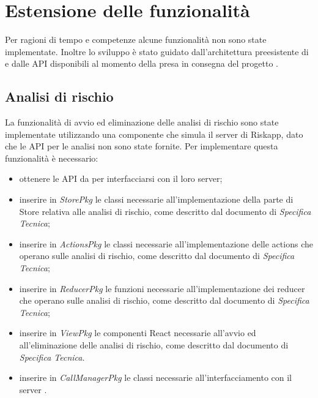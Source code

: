 \newpage

\section{Estensione delle funzionalità}
Per ragioni di tempo e competenze alcune funzionalità non sono state implementate. Inoltre lo sviluppo è stato guidato dall'architettura preesistente di \riskapp{} e dalle API disponibili al momento della presa in consegna del progetto \progetto.

\subsection{Analisi di rischio}
La funzionalità di avvio ed eliminazione delle analisi di rischio sono state implementate utilizzando una componente che simula il server di Riskapp, dato che le API per le analisi non sono state fornite. Per implementare questa funzionalità è necessario: 
\begin{itemize}
	\item ottenere le API da \riskapp{} per interfacciarsi con il loro server;
	\item inserire in \textit{StorePkg} le classi necessarie all'implementazione della parte di Store relativa alle analisi di rischio, come descritto dal documento di \textit{Specifica Tecnica};
	\item inserire in \textit{ActionsPkg} le classi necessarie all'implementazione delle actions che operano sulle analisi di rischio, come descritto dal documento di \textit{Specifica Tecnica};
	\item inserire in \textit{ReducerPkg} le funzioni necessarie all'implementazione dei reducer che operano sulle analisi di rischio, come descritto dal documento di \textit{Specifica Tecnica};
	\item inserire in \textit{ViewPkg} le componenti React necessarie all'avvio ed all'eliminazione delle analisi di rischio, come descritto dal documento di \textit{Specifica Tecnica}.
	\item inserire in \textit{CallManagerPkg} le classi necessarie all'interfacciamento con il server \riskapp{}.
\end{itemize}

